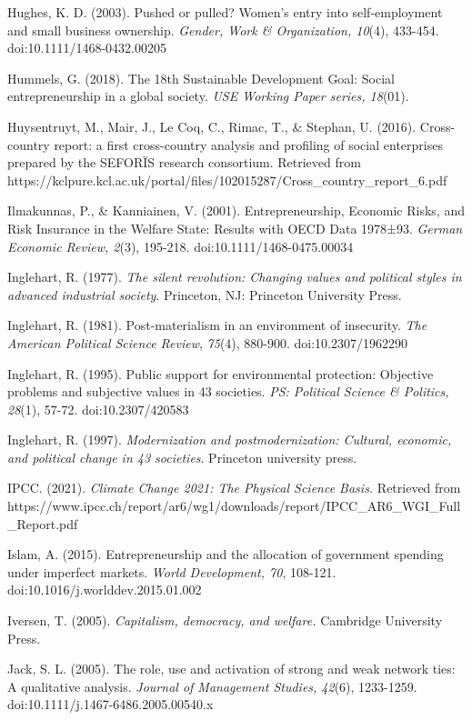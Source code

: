 \documentclass{article}
\begin{document}
Hughes, K. D. (2003). Pushed or pulled? Women's entry into self-employment and small business ownership. \emph{Gender, Work \& Organization, 10}(4), 433-454. doi:10.1111/1468-0432.00205

Hummels, G. (2018). The 18th Sustainable Development Goal: Social entrepreneurship in a global society. \emph{USE Working Paper series, 18}(01). 

Huysentruyt, M., Mair, J., Le Coq, C., Rimac, T., \& Stephan, U. (2016). Cross-country report: a first cross-country analysis and profiling of social enterprises prepared by the SEFORÏS research consortium. Retrieved from https://kclpure.kcl.ac.uk/portal/files/102015287/Cross\_country\_report\_6.pdf

Ilmakunnas, P., \& Kanniainen, V. (2001). Entrepreneurship, Economic Risks, and Risk Insurance in the Welfare State: Results with OECD Data 1978±93. \emph{German Economic Review, 2}(3), 195-218. doi:10.1111/1468-0475.00034

Inglehart, R. (1977). \emph{The silent revolution: Changing values and political styles in advanced industrial society}. Princeton, NJ: Princeton University Press.

Inglehart, R. (1981). Post-materialism in an environment of insecurity. \emph{The American Political Science Review}, \emph{75}(4), 880-900. doi:10.2307/1962290

Inglehart, R. (1995). Public support for environmental protection: Objective problems and subjective values in 43 societies. \emph{PS: Political Science \& Politics, 28}(1), 57-72. doi:10.2307/420583

Inglehart, R. (1997). \emph{Modernization and }\emph{postmodernization}\emph{: Cultural, economic, and political change in 43 societies}. Princeton university press.

IPCC. (2021). \emph{Climate Change 2021: The Physical Science Basis. }Retrieved from https://www.ipcc.ch/report/ar6/wg1/downloads/report/IPCC\_AR6\_WGI\_Full\_Report.pdf

Islam, A. (2015). Entrepreneurship and the allocation of government spending under imperfect markets. \emph{World Development, 70}, 108-121. doi:10.1016/j.worlddev.2015.01.002

Iversen, T. (2005). \emph{Capitalism, democracy, and welfare.} Cambridge University Press.

Jack, S. L. (2005). The role, use and activation of strong and weak network ties: A qualitative analysis. \emph{Journal of Management Studies, 42}(6), 1233-1259. doi:10.1111/j.1467-6486.2005.00540.x
\end{document}
